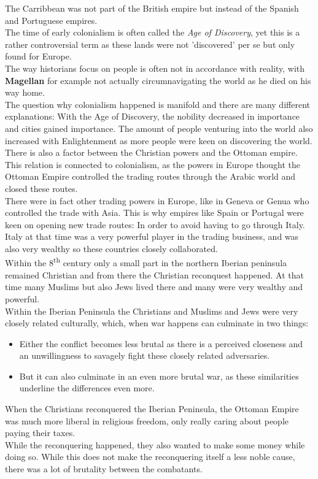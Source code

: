 \documentclass{article}
\begin{document}
	The Carribbean was not part of the British empire but instead of the Spanish and Portuguese empires. \\
	The time of early colonialism is often called the \textit{Age of Discovery}, yet this is a rather controversial term as these lands were not 'discovered' per se but only found for Europe. \\
	The way historians focus on people is often not in accordance with reality, with \textbf{Magellan} for example not actually circumnavigating the world as he died on his way home. \\
	The question why colonialism happened is manifold and there are many different explanations:
	With the Age of Discovery, the nobility decreased in importance and cities gained importance. The amount of people venturing into the world also increased with Enlightenment as more people were keen on discovering the world. \\
	There is also a factor between the Christian powers and the Ottoman empire. This relation is connected to colonialism, as the powers in Europe thought the Ottoman Empire controlled the trading routes through the Arabic world and closed these routes. \\
	There were in fact other trading powers in Europe, like in Geneva or Genua who controlled the trade with Asia. This is why empires like Spain or Portugal were keen on opening new trade routes: In order to avoid having to go through Italy. \\
	Italy at that time was a very powerful player in the trading business, and was also very wealthy so these countries closely collaborated. \\
	Within the 8\textsuperscript{th} century only a small part in the northern Iberian peninsula remained Christian and from there the Christian reconquest happened. At that time many Muslims but also Jews lived there and many were very wealthy and powerful. \\
	Within the Iberian Peninsula the Christians and Muslims and Jews were very closely related culturally, which, when war happens can culminate in two things:
	\begin{itemize}
		\item{Either the conflict becomes less brutal as there is a perceived closeness and an unwillingness to savagely fight these closely related adversaries.}
		\item{But it can also culminate in an even more brutal war, as these similarities underline the differences even more.}
	\end{itemize}
	When the Christians reconquered the Iberian Peninsula, the Ottoman Empire was much more liberal in religious freedom, only really caring about people paying their taxes. \\
	While the reconquering happened, they also wanted to make some money while doing so. While this does not make the reconquering itself a less noble cause, there was a lot of brutality between the combatants. \\
\end{document}
